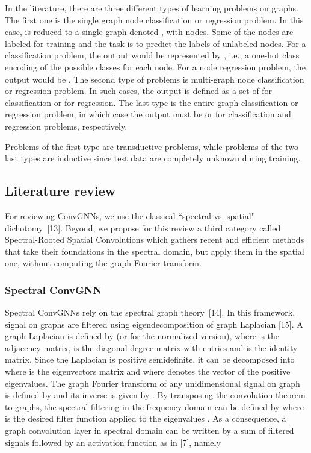 \documentclass{article}
\begin{document}
In the literature, there are three different types of learning problems on graphs. The first one is the single graph node classification or regression problem. In this case,  is reduced to a single graph denoted , with  nodes. Some of the nodes are labeled for training and the task is to predict the labels of unlabeled nodes. For a classification problem, the output would be represented by , i.e., a one-hot class encoding of the  possible classes for each node. For a node regression problem, the output would be . The second type of problems is multi-graph node classification or regression problem. In such cases, the output is defined as a set of  for classification or   for regression. The last type is the entire graph classification or regression problem, in which case the output must be  or   for classification and regression problems, respectively. 

Problems of the first type are transductive problems, while problems of the two last types are inductive since test data are completely unknown during training.

\subsection{Literature review}

For reviewing ConvGNNs, we use the classical ``spectral vs. spatial" dichotomy~[13]. Beyond, we propose for this review a third category called Spectral-Rooted Spatial Convolutions which gathers recent and efficient methods that take their foundations in the spectral domain, but apply them in the spatial one, without computing the graph Fourier transform. 


\subsubsection{Spectral ConvGNN}
\label{sec2.2}

Spectral ConvGNNs rely on the spectral graph
theory~[14]. In this framework, signal on graphs are filtered using eigendecomposition of graph Laplacian [15]. A graph Laplacian is defined by  (or  for the normalized version), where  is the adjacency matrix,   is the diagonal degree matrix with entries  and  is the identity matrix. Since the Laplacian is positive semidefinite, it can be decomposed into  where  is the eigenvectors matrix and  where  denotes the vector of the positive eigenvalues. The graph Fourier transform of any unidimensional signal on graph is defined by
 and its inverse is given by . By transposing the convolution theorem to graphs, the spectral filtering in the frequency domain can be defined by 
where  is the desired filter function applied to the eigenvalues . 
As a consequence, a graph convolution layer in spectral domain can be written by a sum of filtered signals followed by an activation function as in [7], namely 
\end{document}
